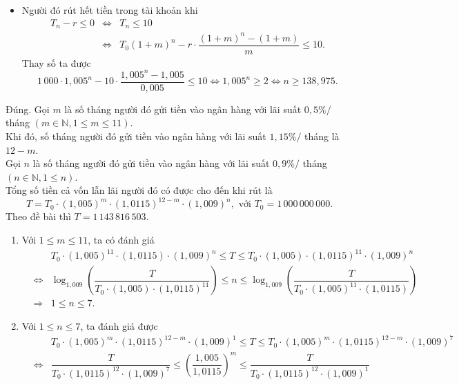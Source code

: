 \begin{ex}
{\begin{itemchoice}
\begin{itemize}
\begin{eqnarray*}
      &=&T_0 \left(1+m\right)^n-r\cdot\dfrac{\left(1+m\right)^n-\left(1+m\right)}{m}.
    \end{eqnarray*}
    \item Người đó rút hết tiền trong  tài khoản khi
    \begin{eqnarray*}
     T_n-r\le 0&\Leftrightarrow& T_n \le 10\\ 
     &\Leftrightarrow& T_0  \left(1+m\right)^n-r\cdot\dfrac{\left(1+m\right)^n-\left(1+m\right)}{m} \le 10.
    \end{eqnarray*}
    Thay số ta được \[1\,000\cdot 1{,}005^n-10\cdot\dfrac{1{,}005^n-1{,}005}{0{,}005}  \le 10\Leftrightarrow 1{,}005^n \ge 2\Leftrightarrow n\ge 138{,}975.\]
   \end{itemize}
   \itemch Đúng. Gọi $m$  là số tháng người đó gửi tiền vào ngân hàng với lãi suất $0{,}5\% /$ tháng $(m\in \mathbb{N},1\le m\le 11)$.\\
   Khi đó, số tháng  người đó gửi tiền vào ngân hàng với lãi suất $1{,}15\% /$ tháng là $12-m$.\\
   Gọi $n$ là số tháng người đó gửi tiền vào ngân hàng  với lãi suất $0{,}9\% /$ tháng $\left(n\in \mathbb{N},1\le n\right)$.\\
   Tổng số tiền cả vốn lẫn lãi người đó  có được cho đến khi rút là \[T=T_0 \cdot (1{,}005)^m \cdot (1{,}0115)^{12-m} \cdot (1{,}009)^n,\text{ với } T_0=1\,000\,000\,000.\]
   Theo đề bài  thì $T=1\,143\,816\,503$.
   \begin{enumerate}[\bf Bước 1.]
    \item Với  $1\le m\le 11$, ta có đánh giá
    \begin{eqnarray*}
      & &T_0 \cdot (1{,}005)^{11} \cdot (1{,}0115)\cdot (1{,}009)^n \le T\le T_0 \cdot (1{,}005)\cdot (1{,}0115)^{11} \cdot (1{,}009)^n\\
     &\Leftrightarrow& \log _{1{,}009} \left(\dfrac{T}{T_0 \cdot (1{,}005)\cdot (1{,}0115)^{11}} \right)\le n\le  \log _{1{,}009} \left(\dfrac{T}{T_0 \cdot (1{,}005)^{11} \cdot (1{,}0115)} \right)\\
     &\Rightarrow& 1\le  n\le 7.
    \end{eqnarray*}
    \item Với $1\le  n\le 7$, ta đánh giá được
    \begin{eqnarray*}
     & &T_0 \cdot (1{,}005)^m \cdot (1{,}0115)^{12-m} \cdot (1{,}009)^1 \le T\le T_0 \cdot  (1{,}005)^m \cdot (1{,}0115)^{12-m} \cdot (1{,}009)^7\\
     &\Leftrightarrow& \dfrac{T}{T_0 \cdot (1{,}0115)^{12} \cdot (1{,}009)^7} \le \left(\dfrac{1{,}005}{1{,}0115} \right)^m \le \dfrac{T}{T_0 \cdot (1{,}0115)^{12}  \cdot (1{,}009)^1}\\

\end{eqnarray*}
\end{enumerate}
\end{itemchoice}}
\end{ex}
